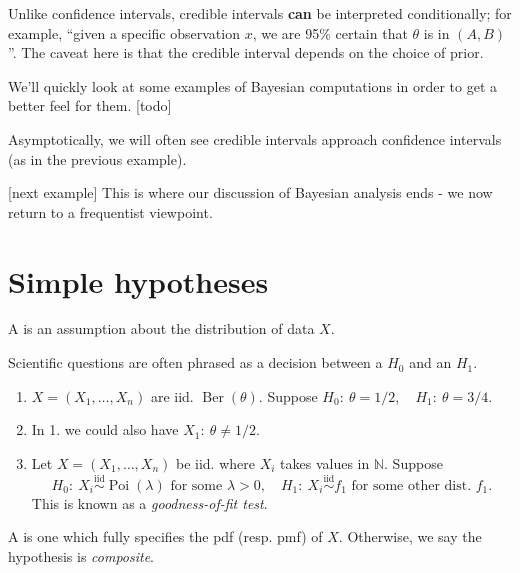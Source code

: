 \documentclass[egregdoesnotlikesansseriftitles,a4paper]{scrartcl}
\begin{document}
\begin{remark}
      Unlike confidence intervals, credible intervals \textbf{can} be interpreted conditionally; for example, ``given a specific observation $x$, we are 95\% certain that $\theta $ is in $(A,B)$''. The caveat here is that the credible interval depends on the choice of prior.
\end{remark}
We'll quickly look at some examples of Bayesian computations in order to get a better feel for them.
[todo]
\begin{remark}
      Asymptotically, we will often see credible intervals approach confidence intervals (as in the previous example).
\end{remark}
[next example]
This is where our discussion of Bayesian analysis ends - we now return to a frequentist viewpoint.
\newpage
\section{Simple hypotheses}
\begin{definition*}[Hypothesis]
      A  is an assumption about the distribution of data $X$.
\end{definition*}
Scientific questions are often phrased as a decision between a  $H_0 $ and an  $H_1 $. 
\begin{example*}
      \begin{enumerate}
           \item $X = (X_1 ,\ldots,X_n)$ are iid. $\operatorname{Ber}(\theta )$. Suppose $H_0: \ \theta =1/2, \quad H_1 : \ \theta =3/4$.
           \item In 1. we could also have $X_1 :\ \theta \neq 1/2$.
           \item Let $X = (X_1 ,\ldots,X_n)$ be iid. where $X_i$ takes values in $\mathbb{N}$. Suppose \[
           H_0 : \ X_{i} \overset{\operatorname{iid}}{\sim} \operatorname{Poi}(\lambda ) \text{ for some } \lambda >0, \quad H_1 : \ X_{i} \overset{\operatorname{iid}}{\sim} f_{1} \text{ for some other dist. } f_{1}
           .\] This is known as a \emph{goodness-of-fit test}.
      \end{enumerate}
\end{example*}
\begin{definition*}
      A  is one which fully specifies the pdf (resp. pmf) of $X$. Otherwise, we say the hypothesis is \emph{composite}.
\end{definition*}
\end{document}
